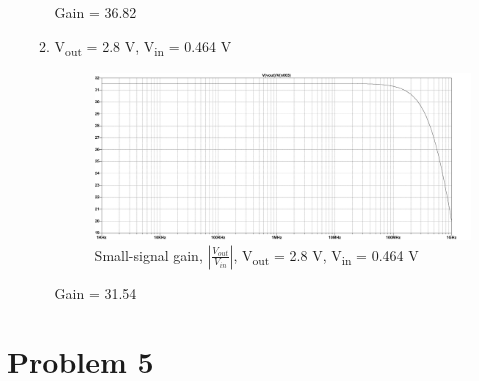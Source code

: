 \documentclass{article}
\begin{document}
\begin{enumerate}[(a)]
\begin{enumerate}[1.]
Gain = 36.82

\item V\textsubscript{out} = 2.8 V, V\textsubscript{in} = 0.464 V
\begin{figure}[H]
\centering
\includegraphics[width=.9\linewidth]{img/q4/e2.pdf}
\caption{\label{fig:gain-q4-e2}Small-signal gain, \(|\frac{V_{out}}{V_{in}}|\), V\textsubscript{out} = 2.8 V, V\textsubscript{in} = 0.464 V}
\end{figure}

Gain = 31.54
\end{enumerate}
\end{enumerate}
\section{Problem 5}
\label{sec:org1ec73a1}
\end{document}

